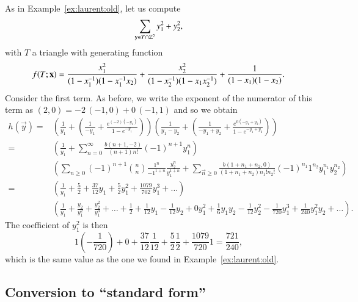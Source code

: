 \begin{example}
As in Example~\ref{ex:laurent:old}, let us compute
$$
\sum_{\vec y \in T\cap \ZZ^2} y_1^2 + y_2^2
,
$$
with $T$ a triangle with generating function
$$
\f T x =
\frac{x_1^2}{(1-x_1^{-1})(1-x_1^{-1}x_2)}
+
\frac{x_2^2}{(1-x_2^{-1})(1-x_1 x_2^{-1})}
+
\frac1{(1-x_1)(1-x_2)}
.
$$
Consider the first term.  As before, we write the exponent of
the numerator of this term as
$(2,0) = -2 \, (-1,0) + 0 \, (-1, 1)$ and so we obtain
\begin{align*}
h(\vec y)
=&
\left(
\frac 1{y_1}
+ \left(
\frac 1{-y_1}
+
\frac {e^{(-2)(-y_1)}}{1-e^{-y_1}}
\right)
\right)
\left(
\frac 1{y_1-y_2}
+ \left(
\frac 1{-y_1+y_2}
+
\frac {e^{0(-y_1+y_2)}}{1-e^{-y_1+y_2}}
\right)
\right)
\\
=&
\left(
\frac 1 {y_1} + \sum_{n=0}^{\infty} \frac{b(n+1,-2)}{(n+1)n!} (-1)^{n+1} y_1^n
\right)
\\
&
\left(
\sum_{n\ge 0} (-1)^{n+1} {n \choose n} \frac {1^n}{{-1}^{1+n}}
					\frac {y_2^{n}}{y_1^{1+n}}
+ \sum_{\vec n \ge 0} \frac{b(1+n_1+n_2,0)}{(1+n_1+n_2)n_1!n_2!}
	(-1)^{n_1} 1^{n_2} y_1^{n_1} y_2^{n_2}
\right)
\\
=&
\left(
\frac 1 {y_1} + \frac 5 2 + \frac {37}{12} y_1 + \frac 5 2 y_1^2
+ \frac {1079}{702} y_1^3 + \ldots
\right)
\\
&
\left(
\frac 1 {y_1} + \frac {y_2}{y_1^2} + \frac {y_2^2}{y_1^3} + \ldots
+
\frac 1 2
+ \frac 1 {12} y_1
- \frac 1 {12} y_2
+ 0 y_1^2
+ \frac 1 6 y_1 y_2
- \frac 1 {12} y_2^2
- \frac 1 {720} y_1^3
+ \frac 1 {240} y_1^2 y_2
+ \ldots
\right)
.
\end{align*}
The coefficient of $y_1^2$ is then
$$
1(-\frac 1 {720}) + 0 + \frac{37}{12}\frac 1{12} + \frac 5 2\frac 1 2
+ \frac{1079}{720} 1 = \frac{721}{240}
,
$$
which is the same value as the one we found in
Example~\ref{ex:laurent:old}.
\end{example}

\subsection{Conversion to ``standard form''}
\label{s:standard}

